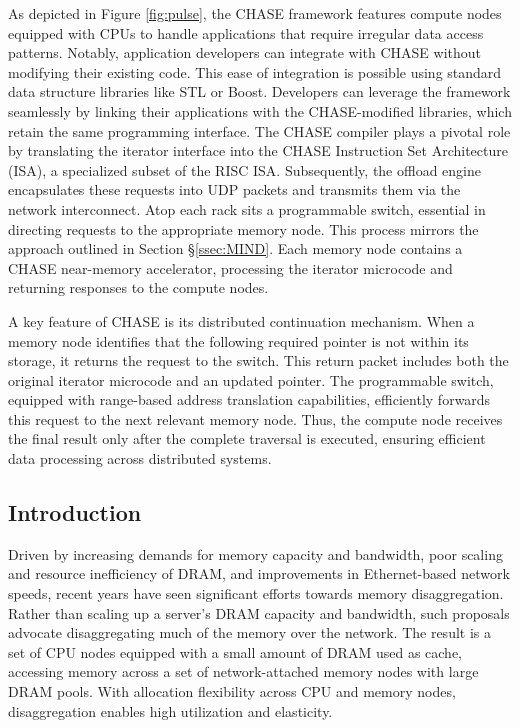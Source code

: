 As depicted in Figure \ref{fig:pulse}, the CHASE framework features compute nodes equipped with CPUs to handle applications that require irregular data access patterns. Notably, application developers can integrate with CHASE without modifying their existing code. This ease of integration is possible using standard data structure libraries like STL or Boost. Developers can leverage the framework seamlessly by linking their applications with the CHASE-modified libraries, which retain the same programming interface. The CHASE compiler plays a pivotal role by translating the iterator interface into the CHASE Instruction Set Architecture (ISA), a specialized subset of the RISC ISA. Subsequently, the offload engine encapsulates these requests into UDP packets and transmits them via the network interconnect. Atop each rack sits a programmable switch, essential in directing requests to the appropriate memory node. This process mirrors the approach outlined in Section \S\ref{ssec:MIND}. Each memory node contains a CHASE near-memory accelerator, processing the iterator microcode and returning responses to the compute nodes.

A key feature of CHASE is its distributed continuation mechanism. When a memory node identifies that the following required pointer is not within its storage, it returns the request to the switch. This return packet includes both the original iterator microcode and an updated pointer. The programmable switch, equipped with range-based address translation capabilities, efficiently forwards this request to the next relevant memory node. Thus, the compute node receives the final result only after the complete traversal is executed, ensuring efficient data processing across distributed systems.

\subsection{Introduction}

Driven by increasing demands for memory capacity and bandwidth, poor scaling and resource inefficiency of DRAM, and improvements in Ethernet-based network speeds, recent years have seen significant efforts towards memory disaggregation. Rather than scaling up a server's DRAM capacity and bandwidth, such proposals advocate disaggregating much of the memory over the network. The result is a set of CPU nodes equipped with a small amount of DRAM used as cache, accessing memory across a set of network-attached memory nodes with large DRAM pools. With allocation flexibility across CPU and memory nodes, disaggregation enables high utilization and elasticity.

